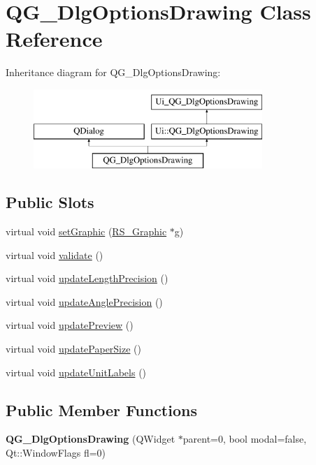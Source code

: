 \hypertarget{classQG__DlgOptionsDrawing}{\section{Q\-G\-\_\-\-Dlg\-Options\-Drawing Class Reference}
\label{classQG__DlgOptionsDrawing}
}
Inheritance diagram for Q\-G\-\_\-\-Dlg\-Options\-Drawing\-:\begin{figure}[H]
\begin{center}
\leavevmode
\includegraphics[height=3.000000cm]{classQG__DlgOptionsDrawing}
\end{center}
\end{figure}
\subsection*{Public Slots}
\begin{DoxyCompactItemize}
\item 
virtual void \hyperlink{classQG__DlgOptionsDrawing_a45cf3fbf54c035afdbb43c528aeeeaad}{set\-Graphic} (\hyperlink{classRS__Graphic}{R\-S\-\_\-\-Graphic} $\ast$g)
\item 
virtual void \hyperlink{classQG__DlgOptionsDrawing_a4886ebcbda73633f4eacc1f055181316}{validate} ()
\item 
virtual void \hyperlink{classQG__DlgOptionsDrawing_ac50d931f95931ad06ca5e9ab3b13ea32}{update\-Length\-Precision} ()
\item 
virtual void \hyperlink{classQG__DlgOptionsDrawing_a449c3c0f20c6899718fa77645ba603ea}{update\-Angle\-Precision} ()
\item 
virtual void \hyperlink{classQG__DlgOptionsDrawing_ae6151439653893621e8d6959567089c9}{update\-Preview} ()
\item 
virtual void \hyperlink{classQG__DlgOptionsDrawing_a26a132ccde91d967bc041c9e8c516f8a}{update\-Paper\-Size} ()
\item 
virtual void \hyperlink{classQG__DlgOptionsDrawing_ac11911738cb8f5801cb71552c39e1818}{update\-Unit\-Labels} ()
\end{DoxyCompactItemize}
\subsection*{Public Member Functions}
\begin{DoxyCompactItemize}
\item 
\hypertarget{classQG__DlgOptionsDrawing_a198002d0382f4341bcab632af31e4073}{{\bfseries Q\-G\-\_\-\-Dlg\-Options\-Drawing} (Q\-Widget $\ast$parent=0, bool modal=false, Qt\-::\-Window\-Flags fl=0)}\label{classQG__DlgOptionsDrawing_a198002d0382f4341bcab632af31e4073}

\end{DoxyCompactItemize}
